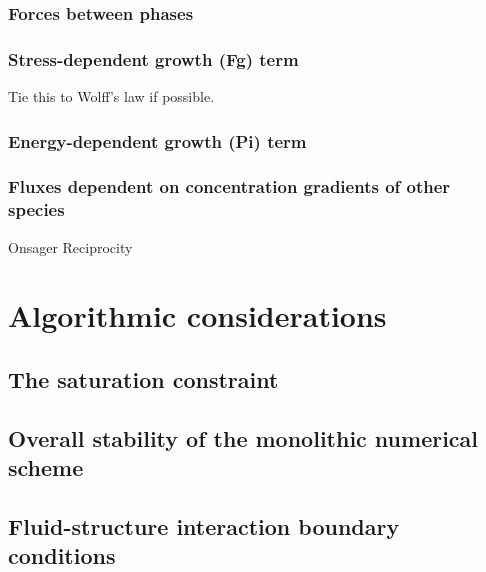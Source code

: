 \subsubsection{Forces between phases}
\subsubsection{Stress-dependent growth (Fg) term}
\label{eu-stress-dependent-source}
Tie this to Wolff's law if possible.
\subsubsection{Energy-dependent growth (Pi) term}
\subsubsection{Fluxes dependent on concentration gradients of other
  species}
\label{onsager-reciprocity}
Onsager Reciprocity
\section{Algorithmic considerations}
\label{eu-algorithmic-considerations}
\subsection{The saturation constraint}
\subsection{Overall stability of the monolithic numerical scheme}
\subsection{Fluid-structure interaction boundary conditions}



%

